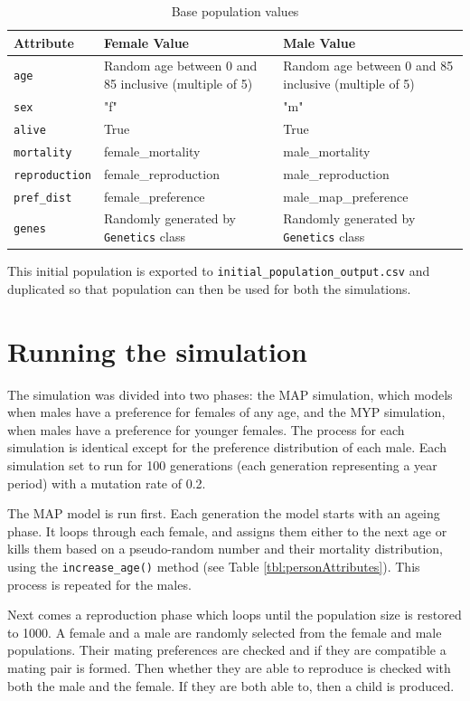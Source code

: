 \documentclass[authoryearcitations]{UoYCSproject}
\begin{document}
\begin{table}[h]
\caption{Base population values}
\label{tbl:basePopulationValues}
\begin{tabular}{m{} m{} m{}}
\textbf{Attribute} & \textbf{Female Value} & \textbf{Male Value} \\\hline
\texttt{age} & Random age between 0 and 85 inclusive (multiple of 5) & Random age between 0 and 85 inclusive (multiple of 5) \\\hline
\texttt{sex} & "f" & "m" \\\hline
\texttt{alive} & True & True \\\hline
\texttt{mortality} & female\_mortality & male\_mortality \\\hline
\texttt{reproduction} & female\_reproduction & male\_reproduction \\\hline
\texttt{pref\_dist} & female\_preference & male\_map\_preference \\\hline 
\texttt{genes} & Randomly generated by \texttt{Genetics} class & Randomly generated by \texttt{Genetics} class
\end{tabular}
\end{table}

This initial population is exported to \texttt{initial\_population\_output.csv} and duplicated so that population can then be used for both the simulations.

\section{Running the simulation}
The simulation was divided into two phases: the MAP simulation, which models when males have a preference for females of any age, and the MYP simulation, when males have a preference for younger females. The process for each simulation is identical except for the preference distribution of each male. Each simulation set to run for 100 generations (each generation representing a year period) with a mutation rate of 0.2.

The MAP model is run first. Each generation the model starts with an ageing phase. It loops through each female, and assigns them either to the next age or kills them based on a pseudo-random number and their mortality distribution, using the \texttt{increase\_age()} method (see Table \ref{tbl:personAttributes}). This process is repeated for the males.

Next comes a reproduction phase which loops until the population size is restored to 1000. A female and a male are randomly selected from the female and male populations. Their mating preferences are checked and if they are compatible a mating pair is formed. Then whether they are able to reproduce is checked with both the male and the female. If they are both able to, then a child is produced.
\end{document}
